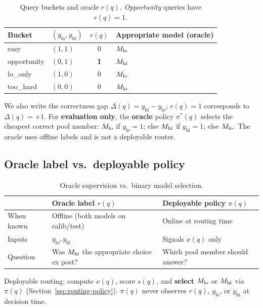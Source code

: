 \begin{table}[t]
  \centering
  \small
  \begin{tabular}{@{}llcl@{}}
    \toprule
    \textbf{Bucket} & $(y_{\mathrm{lo}}, y_{\mathrm{hi}})$ & $r(q)$ & \textbf{Appropriate model (oracle)} \\
    \midrule
    easy         & $(1,1)$ & 0 & $M_{\mathrm{lo}}$ \\
    opportunity  & $(0,1)$ & \textbf{1} & $M_{\mathrm{hi}}$ \\
    lo\_only     & $(1,0)$ & 0 & $M_{\mathrm{lo}}$ \\
    too\_hard    & $(0,0)$ & 0 & $M_{\mathrm{lo}}$ \\
    \bottomrule
  \end{tabular}
  \caption{Query buckets and oracle $r(q)$. \emph{Opportunity} queries have $r(q)=1$.}
  \label{tab:buckets}
\end{table}

We also write the correctness gap $\Delta(q)=y_{\mathrm{hi}}-y_{\mathrm{lo}}$; $r(q)=1$ corresponds to $\Delta(q)=+1$.
For \textbf{evaluation only}, the \textbf{oracle} policy $\pi^*(q)$ selects the cheapest correct pool member: $M_{\mathrm{lo}}$ if $y_{\mathrm{lo}}=1$; else $M_{\mathrm{hi}}$ if $y_{\mathrm{hi}}=1$; else $M_{\mathrm{lo}}$.
The oracle uses offline labels and is not a deployable router.

\subsection{Oracle label vs.\ deployable policy}
\label{sec:oracle-vs-policy}

\begin{table}[t]
  \centering
  \small
  \begin{tabular}{@{}lll@{}}
    \toprule
    & \textbf{Oracle label $r(q)$} & \textbf{Deployable policy $\pi(q)$} \\
    \midrule
    When known & Offline (both models on calib/test) & Online at routing time \\
    Inputs & $y_{\mathrm{lo}}, y_{\mathrm{hi}}$ & Signals $x(q)$ only \\
    Question & Was $M_{\mathrm{hi}}$ the appropriate choice ex post? & Which pool member should answer? \\
    \bottomrule
  \end{tabular}
  \caption{Oracle supervision vs.\ binary model selection.}
  \label{tab:oracle-vs-policy}
\end{table}

Deployable routing: compute $x(q)$, score $s(q)$, and \textbf{select} $M_{\mathrm{lo}}$ or $M_{\mathrm{hi}}$ via $\pi(q)$ (Section~\ref{sec:routing-policy}).
$\pi(q)$ never observes $r(q)$, $y_{\mathrm{lo}}$, or $y_{\mathrm{hi}}$ at decision time.

